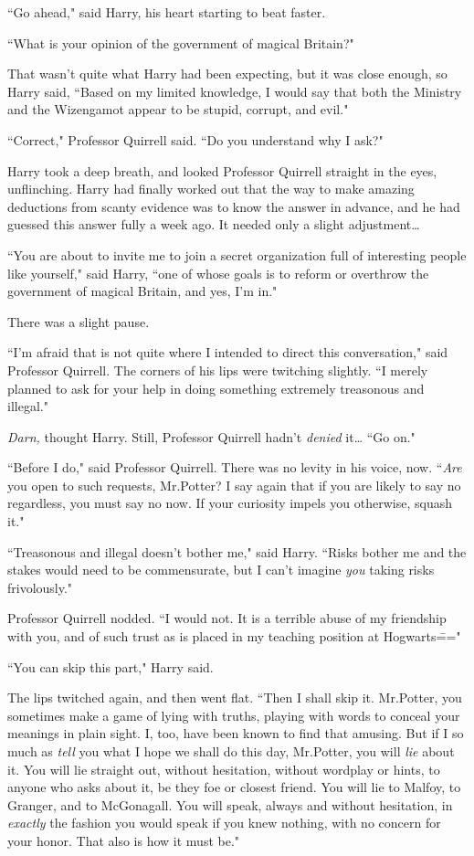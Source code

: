 ``Go ahead," said Harry, his heart starting to beat faster.

``What is your opinion of the government of magical Britain?"

That wasn't quite what Harry had been expecting, but it was close enough, so Harry said, ``Based on my limited knowledge, I would say that both the Ministry and the Wizengamot appear to be stupid, corrupt, and evil."

``Correct," Professor Quirrell said. ``Do you understand why I ask?"

Harry took a deep breath, and looked Professor Quirrell straight in the eyes, unflinching. Harry had finally worked out that the way to make amazing deductions from scanty evidence was to know the answer in advance, and he had guessed this answer fully a week ago. It needed only a slight adjustment{\ldots}

``You are about to invite me to join a secret organization full of interesting people like yourself," said Harry, ``one of whose goals is to reform or overthrow the government of magical Britain, and yes, I'm in."

There was a slight pause.

``I'm afraid that is not quite where I intended to direct this conversation," said Professor Quirrell. The corners of his lips were twitching slightly. ``I merely planned to ask for your help in doing something extremely treasonous and illegal."

\emph{Darn,} thought Harry. Still, Professor Quirrell hadn't \emph{denied} it{\ldots} ``Go on."

``Before I do," said Professor Quirrell. There was no levity in his voice, now. ``\emph{Are} you open to such requests, Mr.\?Potter? I say again that if you are likely to say no regardless, you must say no now. If your curiosity impels you otherwise, squash it."

``Treasonous and illegal doesn't bother me," said Harry. ``Risks bother me and the stakes would need to be commensurate, but I can't imagine \emph{you} taking risks frivolously."

Professor Quirrell nodded. ``I would not. It is a terrible abuse of my friendship with you, and of such trust as is placed in my teaching position at Hogwarts\==="

``You can skip this part," Harry said.

The lips twitched again, and then went flat. ``Then I shall skip it. Mr.\?Potter, you sometimes make a game of lying with truths, playing with words to conceal your meanings in plain sight. I, too, have been known to find that amusing. But if I so much as \emph{tell} you what I hope we shall do this day, Mr.\?Potter, you will \emph{lie} about it. You will lie straight out, without hesitation, without wordplay or hints, to anyone who asks about it, be they foe or closest friend. You will lie to Malfoy, to Granger, and to McGonagall. You will speak, always and without hesitation, in \emph{exactly} the fashion you would speak if you knew nothing, with no concern for your honor. That also is how it must be."

